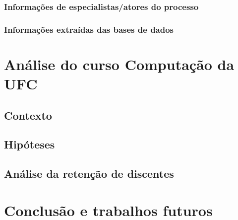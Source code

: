 \documentclass[a4paper]{article}
\begin{document}
\subsubsection{Informações de especialistas/atores do processo}
\subsubsection{Informações extraídas das bases de dados}

\section{Análise do curso Computação da UFC}

\subsection{Contexto}

\subsection{Hipóteses}

\subsection{Análise da retenção de discentes}


\section{Conclusão e trabalhos futuros}




\end{document}
